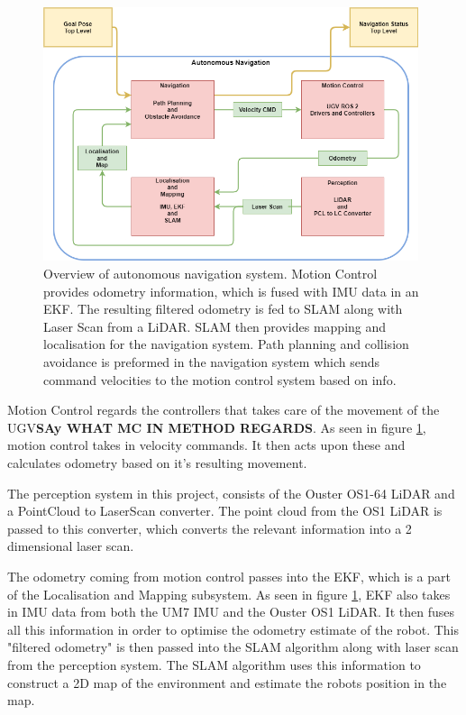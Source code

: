 \begin{figure}[htp]
  \centering
  \includegraphics[width = 0.98\textwidth]{Figures/figANMethod.drawio.png}
  \caption{Overview of autonomous navigation system. Motion Control provides odometry information, which is fused with IMU data in an EKF. The resulting filtered odometry is fed to SLAM along with Laser Scan from a LiDAR. SLAM then provides mapping and localisation for the navigation system. Path planning and collision avoidance is preformed in the navigation system which sends command velocities to the motion control system based on info.}
  \label{fig:M:AN:ANMethod}
\end{figure}

Motion Control regards the controllers that takes care of the movement of the UGV\textbf{SAy WHAT MC IN METHOD REGARDS}. As seen in figure \ref{fig:M:AN:ANMethod}, motion control takes in velocity commands. It then acts upon these and calculates odometry based on it's resulting movement.

The perception system in this project, consists of the Ouster OS1-64 LiDAR and a PointCloud to LaserScan converter. The point cloud from the OS1 LiDAR is passed to this converter, which converts the relevant information into a 2 dimensional laser scan.

The odometry coming from motion control passes into the EKF, which is a part of the Localisation and Mapping subsystem. As seen in figure \ref{fig:M:AN:ANMethod}, EKF also takes in IMU data from both the UM7 IMU and the Ouster OS1 LiDAR. It then fuses all this information in order to optimise the odometry estimate of the robot. This "filtered odometry" is then passed into the SLAM algorithm along with laser scan from the perception system. The SLAM algorithm uses this information to construct a 2D map of the environment and estimate the robots position in the map. 

